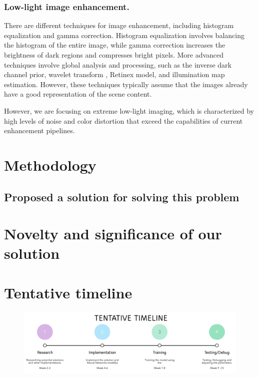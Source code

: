 \documentclass{article}
\begin{document}
\subsubsection{Low-light image enhancement.}

There are different techniques for image enhancement, including histogram equalization and gamma correction. Histogram equalization involves balancing the histogram of the entire image, while gamma correction increases the brightness of dark regions and compresses bright pixels. More advanced techniques involve global analysis and processing, such as the inverse dark channel prior, wavelet transform \cite{AutomaticContrastEnhancement}, Retinex model\cite{retinex}, and illumination map estimation. However, these techniques typically assume that the images already have a good representation of the scene content.

However, we are focusing on extreme low-light imaging, which is characterized by high levels of noise and color distortion that exceed the capabilities of current enhancement pipelines.

\section{Methodology}
\subsection{Proposed a solution for solving this problem}
\section{Novelty and significance of our solution}
\section{Tentative timeline}
\begin{figure}[h]
  \centering
  \includegraphics{timeline.png}
  \fbox{\rule[-.5cm]{0cm}{4cm} \rule[-.5cm]{4cm}{0cm}}
\end{figure}
\printbibliography %
\end{document}
